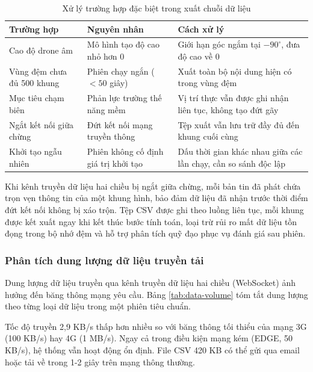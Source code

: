 \begin{table}[H]
\centering
\caption{Xử lý trường hợp đặc biệt trong xuất chuỗi dữ liệu}
\label{tab:csv-edge-cases}
\begin{tabularx}{\linewidth}{lXX}
\toprule
\textbf{Trường hợp} & \textbf{Nguyên nhân} & \textbf{Cách xử lý} \\
\midrule
Cao độ drone âm & Mô hình tạo độ cao nhỏ hơn 0 & Giới hạn góc ngắm tại $-90^{\circ}$, đưa độ cao về 0 \\
Vùng đệm chưa đủ 500 khung & Phiên chạy ngắn ($< 50$ giây) & Xuất toàn bộ nội dung hiện có trong vùng đệm \\
Mục tiêu chạm biên & Phản lực trường thế năng mềm & Vị trí thực vẫn được ghi nhận liên tục, không tạo đứt gãy \\
Ngắt kết nối giữa chừng & Đứt kết nối mạng truyền thông & Tệp xuất vẫn lưu trữ đầy đủ đến khung cuối cùng \\
Khởi tạo ngẫu nhiên & Phiên không cố định giá trị khởi tạo & Dấu thời gian khác nhau giữa các lần chạy, cần so sánh độc lập \\
\bottomrule
\end{tabularx}
\end{table}

Khi kênh truyền dữ liệu hai chiều bị ngắt giữa chừng, mỗi bản tin đã phát chứa trọn vẹn thông tin của một khung hình, bảo đảm dữ liệu đã nhận trước thời điểm đứt kết nối không bị xáo trộn. Tệp CSV được ghi theo luồng liên tục, mỗi khung được kết xuất ngay khi kết thúc bước tính toán, loại trừ rủi ro mất dữ liệu tồn đọng trong bộ nhớ đệm và hỗ trợ phân tích quỹ đạo phục vụ đánh giá sau phiên.

\subsubsection{Phân tích dung lượng dữ liệu truyền tải}

\hspace{0.5cm} Dung lượng dữ liệu truyền qua kênh truyền dữ liệu hai chiều (WebSocket) ảnh hưởng đến băng thông mạng yêu cầu. Bảng \ref{tab:data-volume} tóm tắt dung lượng theo từng loại dữ liệu trong một phiên tiêu chuẩn.

\begin{table}[H]
\centering
\caption{Dung lượng dữ liệu trong phiên 120 giây, 10 Hz}
\label{tab:data-volume}
\end{table}

Tốc độ truyền 2,9 KB/s thấp hơn nhiều so với băng thông tối thiểu của mạng 3G (100 KB/s) hay 4G (1 MB/s). Ngay cả trong điều kiện mạng kém (EDGE, 50 KB/s), hệ thống vẫn hoạt động ổn định. File CSV 420 KB có thể gửi qua email hoặc tải về trong 1-2 giây trên mạng thông thường.

